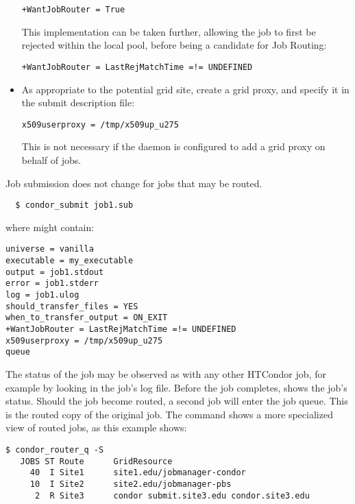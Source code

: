 \begin{itemize}
\begin{verbatim}
+WantJobRouter = True
\end{verbatim}

This implementation can be taken further,
allowing the job to first be rejected within the local pool,
before being a candidate for Job Routing:

\begin{verbatim}
+WantJobRouter = LastRejMatchTime =!= UNDEFINED
\end{verbatim}

\item As appropriate to the potential grid site,
create a grid proxy, and specify it in the submit description file:

\begin{verbatim}
x509userproxy = /tmp/x509up_u275
\end{verbatim}

This is not necessary if the  daemon is configured
to add a grid proxy on behalf of jobs.

\end{itemize}

Job submission does not change for jobs that may be routed.

\begin{verbatim}
  $ condor_submit job1.sub
\end{verbatim}

where  might contain:

\begin{verbatim}
universe = vanilla
executable = my_executable
output = job1.stdout
error = job1.stderr
log = job1.ulog
should_transfer_files = YES
when_to_transfer_output = ON_EXIT
+WantJobRouter = LastRejMatchTime =!= UNDEFINED
x509userproxy = /tmp/x509up_u275
queue
\end{verbatim}

The status of the job may be observed as with any other HTCondor job,
for example by looking in the job's log file.
Before the job completes,
 shows the job's status.
Should the job become routed,
a second job will enter the job queue.
This is the routed copy of the original job.
The command  shows a more specialized view of routed jobs, 
as this example shows:

\begin{verbatim}
$ condor_router_q -S
   JOBS ST Route      GridResource
     40  I Site1      site1.edu/jobmanager-condor
     10  I Site2      site2.edu/jobmanager-pbs
      2  R Site3      condor submit.site3.edu condor.site3.edu
\end{verbatim}

